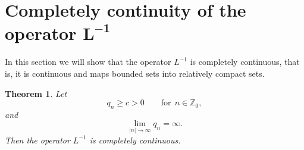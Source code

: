 \documentclass[11pt]{article}
\newtheorem{theorem}{Theorem}
\numberwithin{equation}{section}
\begin{document}
\section[Completely continuity of the operator $L^{-1}$]{Completely continuity of the operator $\boldsymbol{L^{-1}}$}\label{section7}


In this section we will show that the operator $L^{-1}$ is completely
continuous, that is, it is continuous and maps bounded sets into relatively
compact sets.

\begin{theorem}
\label{Th7.1}Let%
\begin{equation}
q_{n}\geq c>0\qquad \text{for} \ \ n\in
\mathbb{Z}_{0},  \label{7.1}
\end{equation}%
and
\begin{equation}
\lim_{\left\vert n\right\vert \rightarrow \infty }q_{n}=\infty .  \label{7.2}
\end{equation}%
Then the operator $L^{-1}$ is completely continuous.
\end{theorem}
\end{document}
